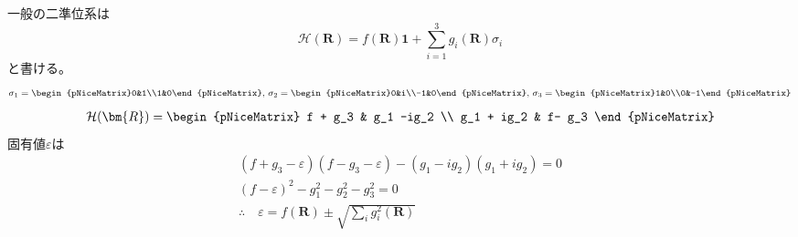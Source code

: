 \documentclass[a4paper,11pt,dvipdfmx]{jsarticle}
\theoremstyle{definition}%
\numberwithin{equation}{section}%
\numberwithin{theorem}{section} %
\begin{document}
\begin{enumerate}[1.]
  一般の二準位系は
  \begin{equation}
    \mathcal{H}(\bm{R}) = f(\bm{R})\bm{1} + \sum_{i=1}^{3} g_{i}(\bm{R})\sigma_{i} \label{1.2.5}
  \end{equation}
  と書ける。
  \begin{equation}
    \sigma_1 = \begin{pNiceMatrix}0&1\\1&0\end{pNiceMatrix} , \,
    \sigma_2 = \begin{pNiceMatrix}0&i\\-1&0\end{pNiceMatrix} , \,
    \sigma_3 = \begin{pNiceMatrix}1&0\\0&-1\end{pNiceMatrix}
  \end{equation}
  \begin{align}
    \mathcal{H}(\bm{R}) =
    \begin{pNiceMatrix}
      f + g_3 & g_1 -ig_2 \\ g_1 + ig_2 & f- g_3
    \end{pNiceMatrix} \label{1.2.6}
  \end{align}
  固有値\(\varepsilon\)は
  \begin{gather}
    (f+g_3-\varepsilon)(f-g_3-\varepsilon) - (g_1-ig_2)(g_1+ig_2) = 0 \\
    (f-\varepsilon)^2 - g_1^2 -g_2^2 - g_3^2 = 0 \\
    \therefore \quad \varepsilon = f(\bm{R}) \pm \sqrt{\sum_{i}g_i^2(\bm{R})} \label{1.2.7}
  \end{gather}
  

\end{enumerate}
\end{document}
